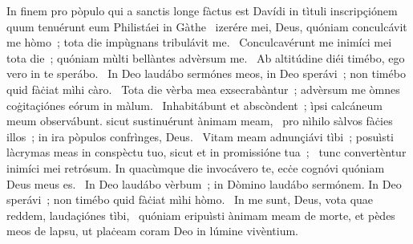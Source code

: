 { In finem pro pòpulo qui a sanctis longe fàctus est Davídi in tìtuli inscripçiónem quum tenuérunt eum Philistáei in Gàthe}
{%
~izerére mei, Deus, quóniam conculcávit me hòmo~; tota die impùgnans tribulávit me. 
~Conculcavérunt me inimíci mei tota die~; quóniam mùlti bellàntes advèrsum me. 
~Ab altitúdine diéi timébo, ego vero in te sperábo. 
~In Deo laudábo sermónes meos, in Deo sperávi~; non timébo quid fàċiat mìhi càro. 
~Tota die vèrba mea exsecrabàntur~; advèrsum me òmnes coġitaçiónes eórum in màlum. 
~Inhabitábunt et abscòndent~; ìpsi calcáneum meum observábunt. sicut sustinuérunt ànimam meam, 
~pro nìhilo sàlvos fàċies illos~; in ira pòpulos confrìnges, Deus. 
~Vitam meam adnunçiávi tìbi~; posuìsti làcrymas meas in conspèctu tuo, sicut et in promissióne tua~; 
~tunc convertèntur inimíci mei retrósum. In quacùmque die invocávero te, ecċe cognóvi quóniam Deus meus es. 
~In Deo laudábo vèrbum~; in Dòmino laudábo sermónem. In Deo sperávi~; non timébo quid fàċiat mìhi hòmo. 
~In me sunt, Deus, vota quae reddem, laudaçiónes tìbi, 
~quóniam eripuìsti ànimam meam de morte, et pèdes meos de lapsu, ut plaċeam coram Deo in lúmine vivèntium. 
}
